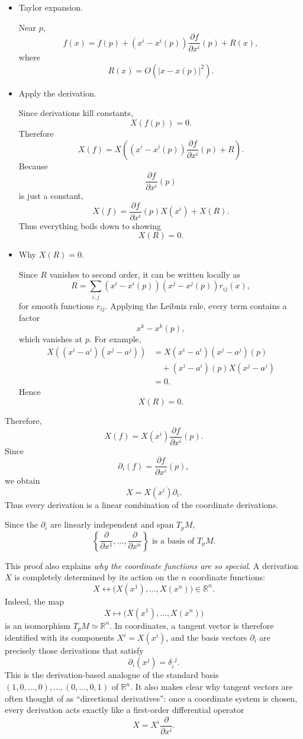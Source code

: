 \documentclass[aps,prl,twocolumn,groupedaddress]{revtex4-2}
\begin{document}
\begin{itemize}
\item Taylor expansion.

Near $p$,
$$
f(x)
=
f(p)
+
(x^i-x^i(p))
\frac{\partial f}{\partial x^i}(p)
+
R(x),
$$
where
$$
R(x)=O(|x-x(p)|^2).
$$

\item Apply the derivation.

Since derivations kill constants,
$$
X(f(p))=0.
$$
Therefore
$$
X(f)
=
X
\left(
(x^i-x^i(p))
\frac{\partial f}{\partial x^i}(p)
+
R
\right).
$$
Because
$$
\frac{\partial f}{\partial x^i}(p)
$$
is just a constant,
$$
X(f)
=
\frac{\partial f}{\partial x^i}(p)
X(x^i)
+
X(R).
$$
Thus everything boils down to showing
$$
X(R)=0.
$$

\item Why $X(R)=0$.

Since $R$ vanishes to second order,
it can be written locally as
$$
R
=
\sum_{i,j}
(x^i-x^i(p))
(x^j-x^j(p))
r_{ij}(x),
$$
for smooth functions $r_{ij}$.
Applying the Leibniz rule,
every term contains a factor
$$
x^k-x^k(p),
$$
which vanishes at $p$.
For example,
$$
\begin{aligned}
X\left((x^i-a^i)(x^j-a^j)\right)
&=
X(x^i-a^i)(x^j-a^j)(p)\\
&\quad+
(x^i-a^i)(p)X(x^j-a^j)\\
&=0.
\end{aligned}
$$
Hence
$$
X(R)=0.
$$
\end{itemize}
Therefore, 
$$
X(f)
=
X(x^i)
\frac{\partial f}{\partial x^i}(p).
$$
Since
$$
\partial_i(f)
=
\frac{\partial f}{\partial x^i}(p),
$$
we obtain
$$
\boxed{
X
=
X(x^i)\partial_i.
}
$$
Thus every derivation is a linear combination of the coordinate derivations.



Since the $\partial_i$ are linearly independent and span $T_pM$,
$$
\boxed{
\left\{
\frac{\partial}{\partial x^1},
\ldots,
\frac{\partial}{\partial x^n}
\right\}
\text{ is a basis of }T_pM.
}
$$


This proof also explains {\em why the coordinate functions are so special}. A derivation $X$ is completely determined by its action on the $n$ coordinate functions:
$$
X
\longleftrightarrow
\bigl(X(x^1),\ldots,X(x^n)\bigr)\in\mathbb{R}^n.
$$
Indeed, the map
$$
X\mapsto \bigl(X(x^1),\ldots,X(x^n)\bigr)
$$
is an isomorphism $T_pM\simeq\mathbb{R}^n$. In coordinates, a tangent vector is therefore identified with its components $X^i=X(x^i)$, and the basis vectors $\partial_i$ are precisely those derivations that satisfy
$$
\partial_i(x^j)=\delta_i^{,j}.
$$
This is the derivation-based analogue of the standard basis $(1,0,\ldots,0),\ldots,(0,\ldots,0,1)$ of $\mathbb{R}^n$. It also makes clear why tangent vectors are often thought of as ``directional derivatives'': once a coordinate system is chosen, every derivation acts exactly like a first-order differential operator
$$
X = X^i\frac{\partial}{\partial x^i}.
$$
\end{document}
